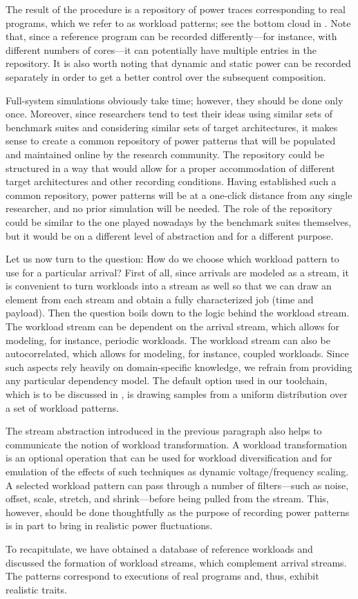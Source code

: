 The result of the procedure is a repository of power traces corresponding to
real programs, which we refer to as workload patterns; see the bottom cloud in
. Note that, since a reference program can be recorded
differently---for instance, with different numbers of cores---it can potentially
have multiple entries in the repository. It is also worth noting that dynamic
and static power can be recorded separately in order to get a better control
over the subsequent composition.

Full-system simulations obviously take time; however, they should be done only
once. Moreover, since researchers tend to test their ideas using similar sets of
benchmark suites and considering similar sets of target architectures, it makes
sense to create a common repository of power patterns that will be populated and
maintained online by the research community. The repository could be structured
in a way that would allow for a proper accommodation of different target
architectures and other recording conditions. Having established such a common
repository, power patterns will be at a one-click distance from any single
researcher, and no prior simulation will be needed. The role of the repository
could be similar to the one played nowadays by the benchmark suites themselves,
but it would be on a different level of abstraction and for a different purpose.

Let us now turn to the question: How do we choose which workload pattern to use
for a particular arrival? First of all, since arrivals are modeled as a stream,
it is convenient to turn workloads into a stream as well so that we can draw an
element from each stream and obtain a fully characterized job (time and
payload). Then the question boils down to the logic behind the workload stream.
The workload stream can be dependent on the arrival stream, which allows for
modeling, for instance, periodic workloads. The workload stream can also be
autocorrelated, which allows for modeling, for instance, coupled workloads.
Since such aspects rely heavily on domain-specific knowledge, we refrain from
providing any particular dependency model. The default option used in our
toolchain, which is to be discussed in , is drawing samples from
a uniform distribution over a set of workload patterns.

The stream abstraction introduced in the previous paragraph also helps to
communicate the notion of workload transformation. A workload transformation is
an optional operation that can be used for workload diversification and for
emulation of the effects of such techniques as dynamic voltage/frequency
scaling. A selected workload pattern can pass through a number of filters---such
as noise, offset, scale, stretch, and shrink---before being pulled from the
stream. This, however, should be done thoughtfully as the purpose of recording
power patterns is in part to bring in realistic power fluctuations.

To recapitulate, we have obtained a database of reference workloads and
discussed the formation of workload streams, which complement arrival streams.
The patterns correspond to executions of real programs and, thus, exhibit
realistic traits.
